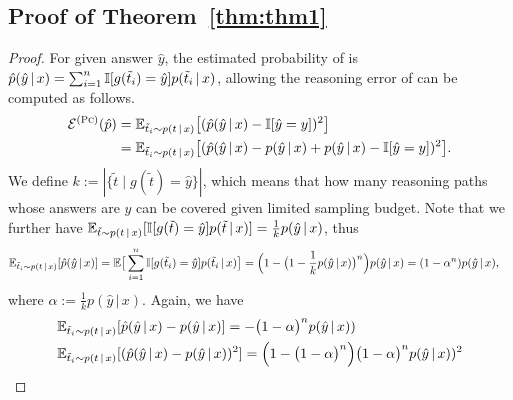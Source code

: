 \subsection{Proof of Theorem~\ref{thm:thm1}} \label{app:thm1}
\begin{proof}
For given answer $\hat{y}$, the estimated probability of \PC is $\hat{p}(\hat{y} \,|\, x) = \sum_{i=1}^n \mathbb{I}[g(\tilde{t}_i) = \hat{y}] p(\tilde{t}_i \,|\, x)$, allowing the reasoning error of \PC can be computed as follows.
    \begin{equation*}
        \begin{aligned}
          \mathcal{E}^{(\textsc{Pc})}(\hat{p}) &= \mathbb{E}_{\tilde{t}_i \sim p(t \,|\, x)} \big[( \hat{p}(\hat{y} \,|\, x) - \mathbb{I}[\hat{y} = y] )^2 \big] \\
	& =\mathbb{E}_{\tilde{t}_i \sim p(t \,|\, x)}\big[(\hat{p}(\hat{y} \,|\, x) - p(\hat{y} \,|\, x) + p(\hat{y} \,|\, x) - \mathbb{I}[\hat{y} = y] )^2 \big].
        \end{aligned}
        \end{equation*}
We define $k := |\{\tilde{t} \mid g(\tilde{t}) = \hat{y}\}|$, which means that how many reasoning paths whose answers are $\hat{y}$ can be covered given limited sampling budget. 
Note that we further have $ \mathbb{E}_{\tilde{t} \sim p(t \,|\, x)} [\mathbb{I}[g(\tilde{t}) = \hat{y}] p(\tilde{t} \,|\, x)] = \frac{1}{k} {p}(\hat{y} \,|\, x)$, thus
\begin{equation*}
\begin{aligned}
\mathbb{E}_{\tilde{t}_i \sim p(t \,|\, x)} [\hat{p}(\hat{y} \,|\, x)] &= \mathbb{E} \big[\sum_{i=1}^n \mathbb{I}[g(\tilde{t}_i) = \hat{y}] p(\tilde{t}_i \,|\, x) \big] = \Big(1 - \big(1 - \frac{1}{k} p(\hat{y} \,|\, x)\big)^n \Big) p(\hat{y} \,|\, x) = (1-\alpha^n)p(\hat{y} \,|\, x),
\end{aligned}
\end{equation*}
where $\alpha := \frac{1}{k} p(\hat{y} \,|\, x)$.
Again, we have
\begin{equation*}
\begin{aligned}
& \mathbb{E}_{\tilde{t}_i \sim p(t \,|\, x)}[\hat{p}(\hat{y} \,|\, x) - p(\hat{y} \,|\, x)] = - \big(1 - \alpha\big)^n p(\hat{y} \,|\, x))  \\
& \mathbb{E}_{\tilde{t}_i \sim p(t \,|\, x)}[(\hat{p}(\hat{y} \,|\, x) - p(\hat{y} \,|\, x))^2] = \Big(1 - \big(1 - \alpha\big)^n \Big) \big(1 - \alpha\big)^n p(\hat{y} \,|\, x))^2   
\end{aligned}
\end{equation*}


\end{proof}
